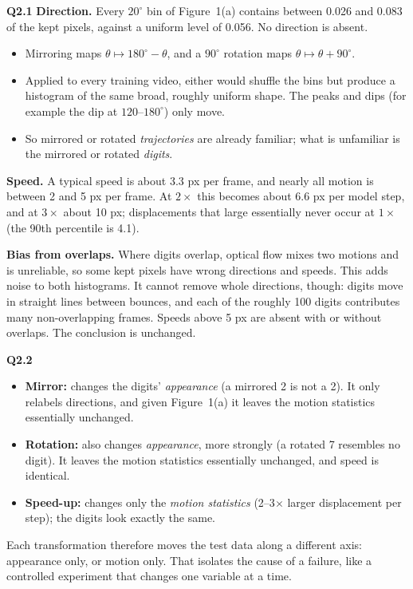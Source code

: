 \documentclass[11pt]{article}
\newcommand{\q}[1]{\par\medskip\noindent\textbf{#1}\quad}
\begin{document}
\q{Q2.1}
\textbf{Direction.} Every $20^\circ$ bin of Figure~1(a) contains between 0.026 and 0.083 of the kept pixels, against a uniform level of 0.056. No direction is absent.
\begin{itemize}
  \item Mirroring maps $\theta\mapsto180^\circ-\theta$, and a $90^\circ$ rotation maps $\theta\mapsto\theta+90^\circ$.
  \item Applied to every training video, either would shuffle the bins but produce a histogram of the same broad, roughly uniform shape. The peaks and dips (for example the dip at $120$--$180^\circ$) only move.
  \item So mirrored or rotated \emph{trajectories} are already familiar; what is unfamiliar is the mirrored or rotated \emph{digits}.
\end{itemize}
\textbf{Speed.} A typical speed is about 3.3 px per frame, and nearly all motion is between 2 and 5 px per frame. At $2\times$ this becomes about 6.6 px per model step, and at $3\times$ about 10 px; displacements that large essentially never occur at $1\times$ (the 90th percentile is 4.1).

\textbf{Bias from overlaps.} Where digits overlap, optical flow mixes two motions and is unreliable, so some kept pixels have wrong directions and speeds. This adds noise to both histograms. It cannot remove whole directions, though: digits move in straight lines between bounces, and each of the roughly 100 digits contributes many non-overlapping frames. Speeds above 5 px are absent with or without overlaps. The conclusion is unchanged.

\q{Q2.2}
\begin{itemize}
  \item \textbf{Mirror:} changes the digits' \emph{appearance} (a mirrored 2 is not a 2). It only relabels directions, and given Figure~1(a) it leaves the motion statistics essentially unchanged.
  \item \textbf{Rotation:} also changes \emph{appearance}, more strongly (a rotated 7 resembles no digit). It leaves the motion statistics essentially unchanged, and speed is identical.
  \item \textbf{Speed-up:} changes only the \emph{motion statistics} (2--3$\times$ larger displacement per step); the digits look exactly the same.
\end{itemize}
Each transformation therefore moves the test data along a different axis: appearance only, or motion only. That isolates the cause of a failure, like a controlled experiment that changes one variable at a time.
\end{document}
